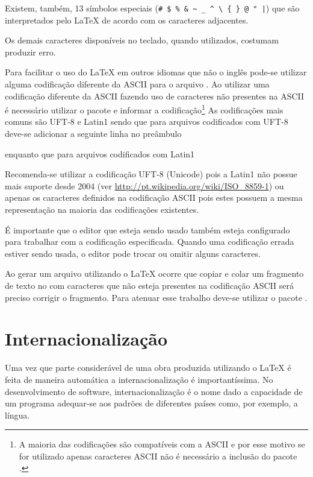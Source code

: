 Existem, também, 13 símbolos especiais (\lstinline!# $ % & ~ _ ^ \ { } @ " |!)
que são interpretados pelo LaTeX de acordo com os caracteres adjacentes.

Os demais caracteres disponíveis no teclado, quando utilizados, costumam
produzir erro.

Para facilitar o uso do LaTeX em outros idiomas que não o inglês pode-se
utilizar alguma codificação diferente da ASCII para o arquivo . Ao
utilizar uma codificação diferente da ASCII fazendo uso de caracteres não
presentes na ASCII é necessário utilizar o pacote  e informar
a codificação\footnote{A maioria das codificações são compatíveis com a ASCII e
por esse motivo se for utilizado apenas caracteres ASCII não é necessário a
inclusão do pacote .} As codificações mais comuns são UFT-8 e
Latin1 sendo que para arquivos codificados com UFT-8 deve-se adicionar a
seguinte linha no preâmbulo
\begin{code}
  \usepackage[utf8]{inputenc}
\end{code}
enquanto que para arquivos codificados com Latin1
\begin{code}
  \usepackage[latin1]{inputenc}
\end{code}
Recomenda-se utilizar a codificação UFT-8 (Unicode) pois a Latin1 não possue
mais suporte desde 2004 (ver \url{http://pt.wikipedia.org/wiki/ISO_8859-1}) ou
apenas os caracteres definidos na codificação ASCII pois estes possuem a mesma
representação na maioria das codificações existentes.

É importante que o editor que esteja sendo usado também esteja configurado para
trabalhar com a codificação especificada. Quando uma codificação errada estiver
sendo usada, o editor pode trocar ou omitir alguns caracteres.

Ao gerar um arquivo  utilizando o LaTeX ocorre que copiar e colar um
fragmento de texto no  com caracteres que não esteja presentes na codificação
ASCII será preciso corrigir o fragmento. Para atenuar esse trabalho deve-se
utilizar o pacote .

\section{Internacionalização}
Uma vez que parte considerável de uma obra produzida utilizando o LaTeX é feita
de maneira automática a internacionalização é importantíssima. No
desenvolvimento de software, internacionalização é o nome dado a capacidade de
um programa adequar-se aos padrões de diferentes países como, por exemplo, a
língua.

